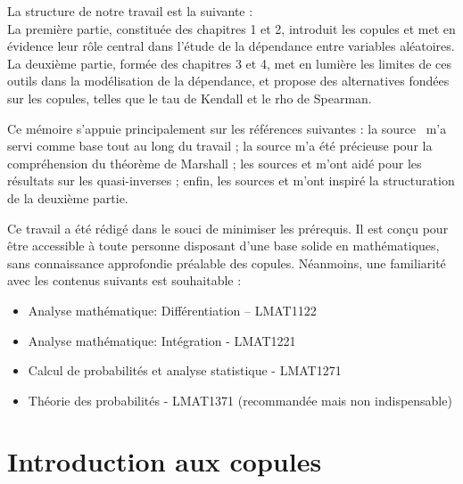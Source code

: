 \documentclass[a4paper,11pt]{amsbook}
\numberwithin{equation}{chapter}
\theoremstyle{definition}
\begin{document}
La structure de notre travail est la suivante :\\
La première partie, constituée des chapitres 1 et 2, introduit les copules et met en évidence leur rôle central dans l’étude de la dépendance entre variables aléatoires.
La deuxième partie, formée des chapitres 3 et 4, met en lumière les limites de ces outils dans la modélisation de la dépendance, et propose des alternatives fondées sur les copules, telles que le tau de Kendall et le rho de Spearman.


\medskip

Ce mémoire s’appuie principalement sur les références suivantes : la source~\cite{nelsen} m'a servi comme base tout au long du travail ; la source \cite{marshall} m’a été précieuse pour la compréhension du théorème de Marshall ; les sources \cite{embrechts} et \cite{lafortelle} m’ont aidé pour les résultats sur les quasi-inverses ; enfin, les sources \cite{kuleuven} et \cite{handbook} m’ont inspiré la structuration de la deuxième partie.

Ce travail a été rédigé dans le souci de minimiser les prérequis. Il est conçu pour être accessible à toute personne disposant d’une base solide en mathématiques, sans connaissance approfondie préalable des copules. Néanmoins, une familiarité avec les contenus suivants est souhaitable :
\begin{itemize}
\item Analyse mathématique: Différentiation – LMAT1122
\item Analyse mathématique: Intégration - LMAT1221
\item Calcul de probabilités et analyse statistique - LMAT1271
\item Théorie des probabilités - LMAT1371 (recommandée mais non indispensable)
\end{itemize}

\newpage
\chapter{Introduction aux copules}
\end{document}
